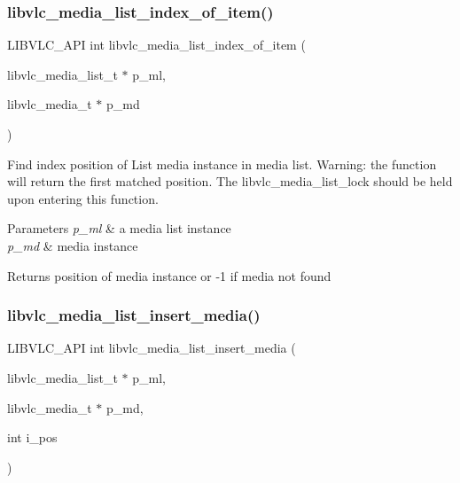 \subsubsection{\texorpdfstring{libvlc\+\_\+media\+\_\+list\+\_\+index\+\_\+of\+\_\+item()}{libvlc\_media\_list\_index\_of\_item()}}
{\footnotesize\ttfamily L\+I\+B\+V\+L\+C\+\_\+\+A\+PI int libvlc\+\_\+media\+\_\+list\+\_\+index\+\_\+of\+\_\+item (\begin{DoxyParamCaption}\item[{libvlc\+\_\+media\+\_\+list\+\_\+t $\ast$}]{p\+\_\+ml,  }\item[{libvlc\+\_\+media\+\_\+t $\ast$}]{p\+\_\+md }\end{DoxyParamCaption})}

Find index position of List media instance in media list. Warning\+: the function will return the first matched position. The libvlc\+\_\+media\+\_\+list\+\_\+lock should be held upon entering this function.


\begin{DoxyParams}{Parameters}
{\em p\+\_\+ml} & a media list instance \\
\hline
{\em p\+\_\+md} & media instance \\
\hline
\end{DoxyParams}
\begin{DoxyReturn}{Returns}
position of media instance or -\/1 if media not found 
\end{DoxyReturn}
\mbox{\label{group__libvlc__media__list_ga96d55d4e9222ad4370774c4662b084e6}} 
\subsubsection{\texorpdfstring{libvlc\+\_\+media\+\_\+list\+\_\+insert\+\_\+media()}{libvlc\_media\_list\_insert\_media()}}
{\footnotesize\ttfamily L\+I\+B\+V\+L\+C\+\_\+\+A\+PI int libvlc\+\_\+media\+\_\+list\+\_\+insert\+\_\+media (\begin{DoxyParamCaption}\item[{libvlc\+\_\+media\+\_\+list\+\_\+t $\ast$}]{p\+\_\+ml,  }\item[{libvlc\+\_\+media\+\_\+t $\ast$}]{p\+\_\+md,  }\item[{int}]{i\+\_\+pos }\end{DoxyParamCaption})}

